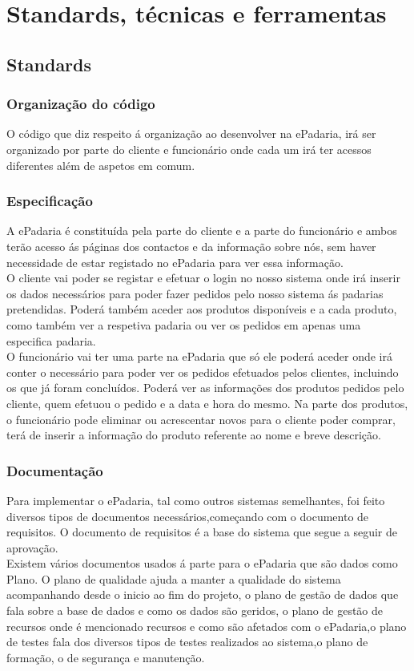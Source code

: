 \chapter{Standards, técnicas e ferramentas}
\label{standards_tecnicas_ferramentas}

\section{Standards}
\subsection{Organização do código}
O código que diz respeito á organização ao desenvolver na ePadaria, irá ser organizado por parte do cliente e funcionário onde cada um irá ter acessos diferentes além de aspetos em comum.
\subsection{Especificação}
A ePadaria é constituída pela parte do cliente e a parte do funcionário e ambos terão acesso ás páginas dos contactos e da informação sobre nós, sem haver necessidade de estar registado no ePadaria para ver essa informação.\\
O cliente vai poder se registar e efetuar o login no nosso sistema onde irá inserir os dados necessários para poder fazer pedidos pelo nosso sistema ás padarias pretendidas. Poderá também aceder aos produtos disponíveis e a cada produto, como também ver a respetiva padaria ou ver os pedidos em apenas uma especifica padaria. \\
O funcionário vai ter uma parte na ePadaria que só ele poderá aceder onde irá conter o necessário para poder ver os pedidos efetuados pelos clientes, incluindo os que já foram concluídos. Poderá ver as informações dos produtos pedidos pelo cliente, quem efetuou o pedido e a data e hora do mesmo. Na parte dos produtos, o funcionário pode eliminar ou acrescentar novos para o cliente poder comprar, terá de inserir a informação do produto referente ao nome e breve descrição.

\subsection{Documentação}
Para implementar o ePadaria, tal como outros sistemas semelhantes, foi feito diversos tipos de documentos necessários,começando com o documento de requisitos. O documento de requisitos é a base do sistema que segue a seguir de aprovação.\\
Existem vários documentos usados á parte para o ePadaria que são dados como Plano. O plano de qualidade ajuda a manter a qualidade do sistema acompanhando desde o inicio ao fim do projeto, o plano de gestão de dados que fala sobre a base de dados e como os dados são geridos, o plano de gestão de recursos onde é mencionado recursos e como são afetados com o ePadaria,o plano de testes fala dos diversos tipos de testes realizados ao sistema,o plano de formação, o de segurança e manutenção.



